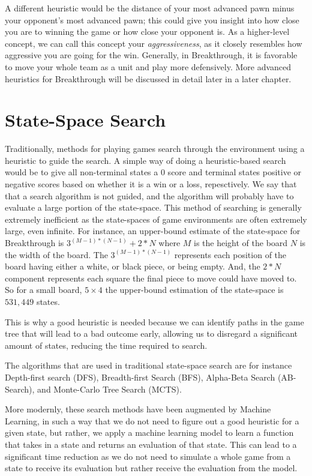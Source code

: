 A different heuristic would be the distance of your most advanced pawn minus your opponent's most advanced pawn; this could give you insight into how close you are to winning the game or how close your opponent is. As a higher-level concept, we can call this concept your \textit{aggressiveness}, as it closely resembles how aggressive you are going for the win. Generally, in Breakthrough, it is favorable to move your whole team as a unit and play more defensively\cite{lorentz:heuristic}. More advanced heuristics for Breakthrough will be discussed in detail later in a later chapter.

\section{State-Space Search}

Traditionally, methods for playing games search through the environment using a heuristic to guide the search. A simple way of doing a heuristic-based search would be to give all non-terminal states a $0$ score and terminal states positive or negative scores based on whether it is a win or a loss, repesctively. We say that that a search algorithm is not guided, and the algorithm will probably have to evaluate a large portion of the state-space. This method of searching is generally extremely inefficient as the state-spaces of game environments are often extremely large, even infinite. For instance, an upper-bound estimate of the state-space for Breakthrough is $3^{(M-1)*(N-1)}+2*N$ where $M$ is the height of the board $N$ is the width of the board. The $3^{(M-1)*(N-1)}$ represents each position of the board having either a white, or black piece, or being empty. And, the $2*N$ component represents each square the final piece to move could have moved to. So for a small board, $5\times 4$ the upper-bound estimation of the state-space is $531{,}449$ states.

This is why a good heuristic is needed because we can identify paths in the game tree that will lead to a bad outcome early, allowing us to disregard a significant amount of states, reducing the time required to search.

The algorithms that are used in traditional state-space search are for instance Depth-first search (DFS), Breadth-first Search (BFS), Alpha-Beta Search (AB-Search)\cite{abpruning:dj}, and Monte-Carlo Tree Search (MCTS).

More modernly, these search methods have been augmented by Machine Learning, in such a way that we do not need to figure out a good heuristic for a given state, but rather, we apply a machine learning model to learn a function that takes in a state and returns an evaluation of that state\cite{neuralnetworksgames:michulke}. This can lead to a significant time reduction as we do not need to simulate a whole game from a state to receive its evaluation but rather receive the evaluation from the model.

